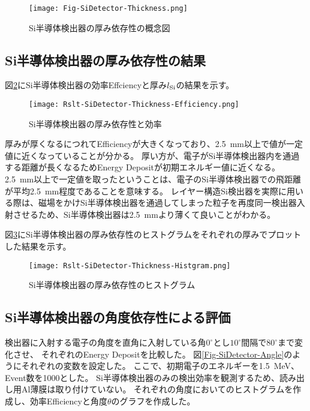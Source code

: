 \documentclass[a4paper,10pt]{jreport}
\begin{document}
\begin{figure}[H]
	\center
	\texttt{[image: Fig-SiDetector-Thickness.png]}
	\caption{Si半導体検出器の厚み依存性の概念図} \label{Fig-SiDetector-Thickness}
\end{figure}




\subsection{Si半導体検出器の厚み依存性の結果}

図\ref{Rslt-SiDetector-Thickness-Efficiency}にSi半導体検出器の効率Effciencyと厚み$l_{\rm{Si}}$の結果を示す。

\begin{figure}[H]
	\center
	\texttt{[image: Rslt-SiDetector-Thickness-Efficiency.png]}
	\caption{Si半導体検出器の厚み依存性と効率} \label{Rslt-SiDetector-Thickness-Efficiency}
\end{figure}

厚みが厚くなるにつれてEfficiencyが大きくなっており、\SI{2.5}{mm}以上で値が一定値に近くなっていることが分かる。
厚い方が、電子がSi半導体検出器内を通過する距離が長くなるためEnergy Depositが初期エネルギー値に近くなる。
\SI{2.5}{mm}以上で一定値を取ったということは、電子のSi半導体検出器での飛距離が平均\SI{2.5}{mm}程度であることを意味する。
レイヤー構造Si検出器を実際に用いる際は、磁場をかけSi半導体検出器を通過してしまった粒子を再度同一検出器入射させるため、Si半導体検出器は\SI{2.5}{mm}より薄くて良いことがわかる。

図\ref{Rslt-SiDetector-Thickness-Histgram}にSi半導体検出器の厚み依存性のヒストグラムをそれぞれの厚みでプロットした結果を示す。

\begin{figure}[H]
	\center
	\texttt{[image: Rslt-SiDetector-Thickness-Histgram.png]}
	\caption{Si半導体検出器の厚み依存性のヒストグラム} \label{Rslt-SiDetector-Thickness-Histgram}
\end{figure}




\subsection{Si半導体検出器の角度依存性による評価}

検出器に入射する電子の角度を直角に入射している角$0^{\circ}$とし$10^{\circ}$間隔で$80^{\circ}$まで変化させ、
それぞれのEnergy Depositを比較した。
 図\ref{Fig-SiDetector-Angle}のようにそれぞれの変数を設定した。
ここで、初期電子のエネルギーを\SI{1.5}{MeV}、Event数を1000とした。
 Si半導体検出器のみの検出効率を観測するため、読み出し用Al薄膜は取り付けていない。
それぞれの角度においてのヒストグラムを作成し、効率Efficiencyと角度$\theta$のグラフを作成した。
\end{document}
